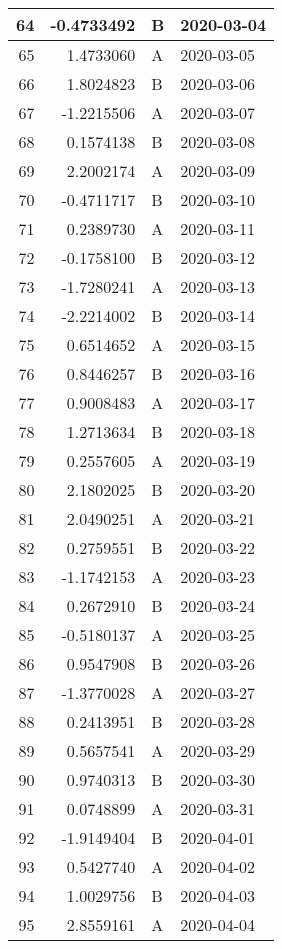 \begin{tabular}{r|r|l|l}
\hline
64 & -0.4733492 & B & 2020-03-04\\
\hline
65 & 1.4733060 & A & 2020-03-05\\
\hline
66 & 1.8024823 & B & 2020-03-06\\
\hline
67 & -1.2215506 & A & 2020-03-07\\
\hline
68 & 0.1574138 & B & 2020-03-08\\
\hline
69 & 2.2002174 & A & 2020-03-09\\
\hline
70 & -0.4711717 & B & 2020-03-10\\
\hline
71 & 0.2389730 & A & 2020-03-11\\
\hline
72 & -0.1758100 & B & 2020-03-12\\
\hline
73 & -1.7280241 & A & 2020-03-13\\
\hline
74 & -2.2214002 & B & 2020-03-14\\
\hline
75 & 0.6514652 & A & 2020-03-15\\
\hline
76 & 0.8446257 & B & 2020-03-16\\
\hline
77 & 0.9008483 & A & 2020-03-17\\
\hline
78 & 1.2713634 & B & 2020-03-18\\
\hline
79 & 0.2557605 & A & 2020-03-19\\
\hline
80 & 2.1802025 & B & 2020-03-20\\
\hline
81 & 2.0490251 & A & 2020-03-21\\
\hline
82 & 0.2759551 & B & 2020-03-22\\
\hline
83 & -1.1742153 & A & 2020-03-23\\
\hline
84 & 0.2672910 & B & 2020-03-24\\
\hline
85 & -0.5180137 & A & 2020-03-25\\
\hline
86 & 0.9547908 & B & 2020-03-26\\
\hline
87 & -1.3770028 & A & 2020-03-27\\
\hline
88 & 0.2413951 & B & 2020-03-28\\
\hline
89 & 0.5657541 & A & 2020-03-29\\
\hline
90 & 0.9740313 & B & 2020-03-30\\
\hline
91 & 0.0748899 & A & 2020-03-31\\
\hline
92 & -1.9149404 & B & 2020-04-01\\
\hline
93 & 0.5427740 & A & 2020-04-02\\
\hline
94 & 1.0029756 & B & 2020-04-03\\
\hline
95 & 2.8559161 & A & 2020-04-04\\

\end{tabular}
